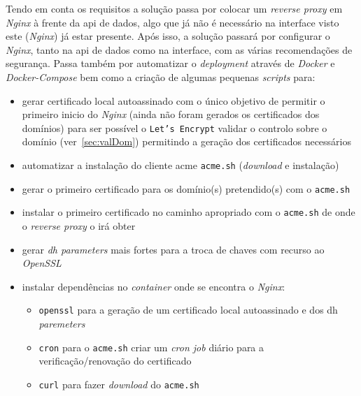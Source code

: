 Tendo em conta os requisitos a solução passa por colocar um \textit{reverse proxy} em \textit{Nginx} à frente da \acrshort{api} de dados, algo que já não é necessário na interface visto este (\textit{Nginx}) já estar presente. Após isso, a solução passará por configurar o \textit{Nginx}, tanto na \acrshort{api} de dados como na interface, com as várias recomendações de segurança. Passa também por automatizar o \textit{deployment} através de \textit{Docker} e \textit{Docker-Compose} bem como a criação de algumas pequenas \textit{scripts} para:
\begin{itemize}
    \item gerar certificado local autoassinado com o único objetivo de permitir o primeiro inicio do \textit{Nginx} (ainda não foram gerados os certificados dos domínios) para ser possível o \texttt{Let's Encrypt} validar o controlo sobre o domínio (ver~\ref{sec:valDom}) permitindo a geração dos certificados necessários
    \item automatizar a instalação do cliente \acrshort{acme} \texttt{acme.sh} (\textit{download} e instalação)
    \item gerar o primeiro certificado para os domínio(s) pretendido(s) com o \texttt{acme.sh}
    \item instalar o primeiro certificado no caminho apropriado com o \texttt{acme.sh} de onde o \textit{reverse proxy} o irá obter
    \item gerar \textit{\acrshort{dh} parameters} mais fortes para a troca de chaves com recurso ao \textit{OpenSSL}
    \item instalar dependências no \textit{container} onde se encontra o \textit{Nginx}:
    \begin{itemize}
        \item \texttt{openssl} para a geração de um certificado local autoassinado e dos \acrshort{dh} \textit{paremeters}
        \item \texttt{cron} para o \texttt{acme.sh} criar um \textit{cron job} diário para a verificação/renovação do certificado
        \item \texttt{curl} para fazer \textit{download} do \texttt{acme.sh}
    \end{itemize}
\end{itemize}

